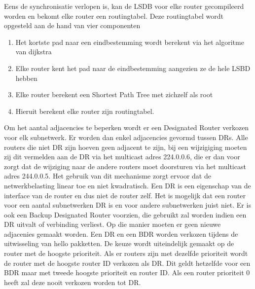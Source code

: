 \documentclass{report}
\begin{document}
\begin{enumerate}
Eens de synchronisatie verlopen is, kan de LSDB voor elke router gecompileerd worden en bekomt elke router een routingtabel. Deze routingtabel wordt opgesteld aan de hand van vier componenten
\begin{enumerate}
	\item Het kortste pad naar een eindbestemming wordt berekent via het algoritme van dijkstra
	\item Elke router kent het pad naar de eindbestemming aangezien ze de hele LSBD hebben
	\item Elke router berekent een Shortest Path Tree met zichzelf als root
	\item Hieruit berekent elke router zijn routingtabel.
\end{enumerate}

Om het aantal adjacencies te beperken wordt er een Designated Router verkozen voor elk subnetwerk. Er worden dan enkel adjacencies gevormd tussen DRs. Alle routers die niet DR zijn hoeven geen adjacent te zijn, bij een wijzigiging moeten zij dit vermelden aan de DR via het multicast adres 224.0.0.6, die er dan voor zorgt dat de wijziging naar de andere routers moet doorsturen via het multicast adres 244.0.0.5. Het gebruik van dit mechanisme zorgt ervoor dat de netwerkbelasting linear toe en niet kwadratisch. Een DR is een eigenschap van de interface van de router en dus niet de router zelf. Het is mogelijk dat een router voor een aantal subnetwerken DR is en voor andere subnetwerken juist niet. Er is ook een Backup Designated Router voorzien, die gebruikt zal worden indien een DR uitvalt of verbinding verliest. Op die manier moeten er geen nieuwe adjacenies gemaakt worden. Een DR en een BDR worden verkozen tijdens de uitwisseling van hello pakketten. De keuze wordt uiteindelijk gemaakt op de router met de hoogste prioriteit. Als er routers zijn met dezelfde prioriteit wordt de router met de hoogste router ID verkozen als DR. Dit geldt hetzelfde voor een BDR maar met tweede hoogste prioriteit en router ID. Als een router prioriteit 0 heeft zal deze nooit verkozen worden tot DR. 


\end{enumerate}
\end{document}

